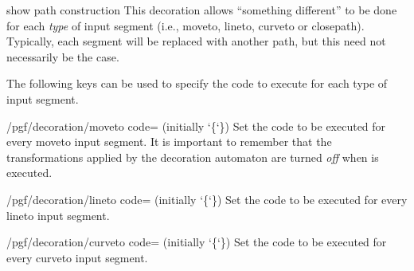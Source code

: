 \begin{decoration}{show path construction}
    This decoration allows ``something different'' to be done for each
    \emph{type} of input segment (i.e., moveto, lineto, curveto or closepath).
    Typically, each segment will be replaced with another path, but this need
    not necessarily be the case.
\begin{codeexample}[]
\end{codeexample}

    The following keys can be used to specify the code to execute for each type
    of input segment.

    \begin{key}{/pgf/decoration/moveto code= (initially \char`\{\char`\})}
        Set the code to be executed for every moveto input segment. It is
        important to remember that the transformations applied by the
        decoration automaton are turned \emph{off} when  is
        executed.
    \end{key}

    \begin{key}{/pgf/decoration/lineto code= (initially \char`\{\char`\})}
        Set the code to be executed for every lineto input segment.
    \end{key}

    \begin{key}{/pgf/decoration/curveto code= (initially \char`\{\char`\})}
        Set the code to be executed for every curveto input segment.
    \end{key}


\end{decoration}

